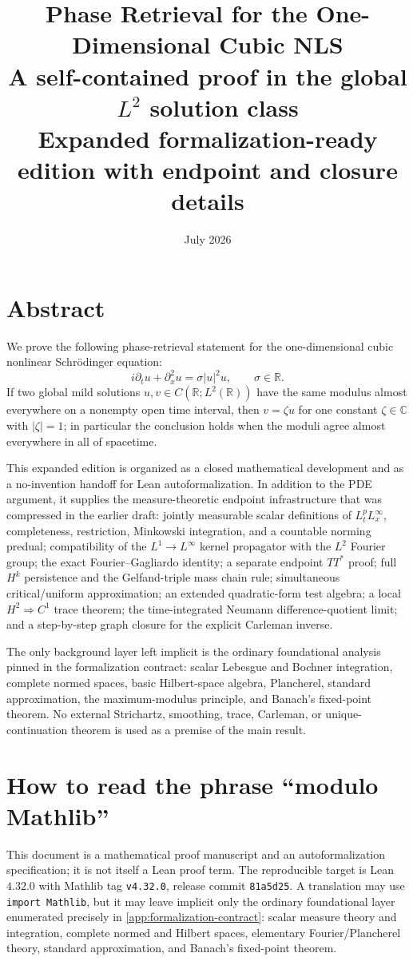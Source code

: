 \documentclass[11pt,oneside]{book}
\title{\textbf{Phase Retrieval for the One-Dimensional Cubic NLS}\\[0.45em]
A self-contained proof in the global $L^2$ solution class\\[0.8em]
\large Expanded formalization-ready edition with endpoint and closure details}
\author{}
\date{July 2026}
\theoremstyle{definition}
\theoremstyle{remark}
\newcommand{\R}{\mathbb R}
\newcommand{\C}{\mathbb C}
\newcommand{\1}{\mathbf 1}
\begin{document}
\frontmatter
\hypersetup{pageanchor=false}
\maketitle
\clearpage
\hypersetup{pageanchor=true}
\setcounter{page}{1}

\chapter*{Abstract}
We prove the following phase-retrieval statement for the one-dimensional
cubic nonlinear Schr\"odinger equation:
\[
  i\partial_tu+\partial_x^2u=\sigma |u|^2u,
  \qquad \sigma\in\R.
\]
If two global mild solutions $u,v\in C(\R;L^2(\R))$ have the same modulus
almost everywhere on a nonempty open time interval, then
$v=\zeta u$ for one constant $\zeta\in\C$ with $|\zeta|=1$; in particular
the conclusion holds when the moduli agree almost everywhere in all of
spacetime.

This expanded edition is organized as a closed mathematical development and
as a no-invention handoff for Lean autoformalization.  In addition to the
PDE argument, it supplies the measure-theoretic endpoint infrastructure that
was compressed in the earlier draft: jointly measurable scalar definitions
of $L^p_tL^\infty_x$, completeness, restriction, Minkowski integration, and
a countable norming predual; compatibility of the $L^1\to L^\infty$ kernel
propagator with the $L^2$ Fourier group; the exact Fourier--Gagliardo identity;
a separate endpoint $TT^*$ proof; full $H^k$ persistence and the
Gelfand-triple mass chain rule; simultaneous critical/uniform approximation;
an extended quadratic-form test algebra; a local $H^2\Rightarrow C^1$ trace
theorem; the time-integrated Neumann difference-quotient limit; and a
step-by-step graph closure for the explicit Carleman inverse.

The only background layer left implicit is the ordinary foundational
analysis pinned in the formalization contract: scalar Lebesgue and Bochner
integration, complete normed spaces, basic Hilbert-space algebra,
Plancherel, standard approximation, the maximum-modulus principle, and Banach's
fixed-point theorem.  No external Strichartz, smoothing, trace, Carleman, or
unique-continuation theorem is used as a premise of the main result.
\chapter*{How to read the phrase ``modulo Mathlib''}
This document is a mathematical proof manuscript and an autoformalization
specification; it is not itself a Lean proof term.  The reproducible target is
Lean $4.32.0$ with Mathlib tag \texttt{v4.32.0}, release commit
\texttt{81a5d25}.  A translation may use \texttt{import Mathlib}, but it may
leave implicit only the ordinary foundational layer enumerated precisely in
\cref{app:formalization-contract}: scalar measure theory and integration,
complete normed and Hilbert spaces, elementary Fourier/Plancherel theory,
standard approximation, and Banach's fixed-point theorem.
\end{document}
